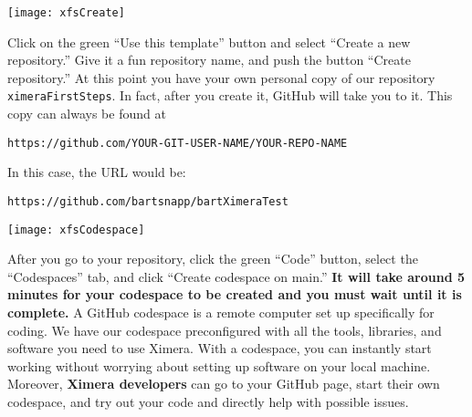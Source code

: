 \documentclass{ximera}
\begin{document}
\begin{image}
    \texttt{[image: xfsCreate]}
\end{image}
        Click on the green ``Use this template'' button and select ``Create a
        new repository.'' Give it a fun repository name, and push the button
        ``Create repository.''
        At this point you have your own personal copy of our repository
        \verb!ximeraFirstSteps!.
        In fact, after you create it, GitHub will take you to it. This copy can
        always
        be found at
        \begin{center}
            \verb!https://github.com/YOUR-GIT-USER-NAME/YOUR-REPO-NAME!
        \end{center}
        In this case, the URL would be: 
        \begin{center}
            \verb!https://github.com/bartsnapp/bartXimeraTest!
        \end{center}
        \newpage
        \pdfOnly{\end{multicols}}
\begin{image}
    \texttt{[image: xfsCodespace]}
\end{image}
        After you go to your repository, click the green ``Code'' button, select the ``Codespaces''
        tab, and click ``Create codespace on main.'' \textbf{It will take
            around 5
            minutes for your codespace to be created and you must wait until it
            is
            complete.} A GitHub codespace is a remote computer set up
        specifically for
        coding. We have our codespace preconfigured with all the tools,
        libraries, and
        software you need to use Ximera. With a codespace, you can instantly
        start
        working without worrying about setting up software on your local
        machine.
        Moreover, \textbf{Ximera developers} can go to your GitHub page, start
        their
        own codespace, and try out your code and directly help with possible issues.

        \pdfOnly{\end{multicols*}}

\newpage
\end{document}
